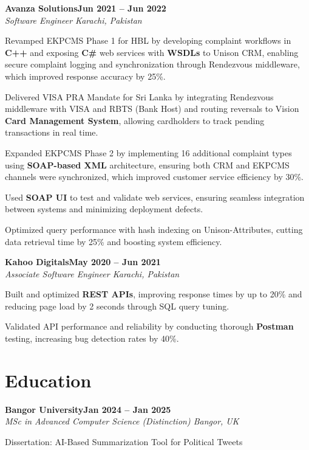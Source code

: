 \documentclass[letterpaper,10pt]{article}
\newcommand{\headingBf}[2]{
  \hspace{10pt}\textbf{#1}\hfill\textbf{#2}\\
}
\newcommand{\headingIt}[2]{
  \hspace{10pt}\textit{#1}\hfill\textit{#2}\\
}
\newenvironment{resume_list}{
  \vspace{-7pt}
  \begin{itemize}[itemsep=-2px, parsep=1pt, leftmargin=30pt]
}{
  \end{itemize}
}
\begin{document}
\headingBf{Avanza Solutions}{Jun 2021 -- Jun 2022}
\headingIt{Software Engineer \hfill Karachi, Pakistan}{}
\begin{resume_list}
    \item Revamped EKPCMS Phase 1 for HBL by developing complaint workflows in \textbf{C++} and exposing \textbf{C\#} web services with \textbf{WSDLs} to Unison CRM, enabling secure complaint logging and synchronization through Rendezvous middleware, which improved response accuracy by 25\%.
    \item Delivered VISA PRA Mandate for Sri Lanka by integrating Rendezvous middleware with VISA and RBTS (Bank Host) and routing reversals to Vision \textbf{Card Management System}, allowing cardholders to track pending transactions in real time.
    \item Expanded EKPCMS Phase 2 by implementing 16 additional complaint types using \textbf{SOAP-based XML} architecture, ensuring both CRM and EKPCMS channels were synchronized, which improved customer service efficiency by 30\%.
    \item Used \textbf{SOAP UI} to test and validate web services, ensuring seamless integration between systems and minimizing deployment defects.
    \item Optimized query performance with hash indexing on Unison-Attributes, cutting data retrieval time by 25\% and boosting system efficiency.
\end{resume_list}

\headingBf{Kahoo Digitals}{May 2020 -- Jun 2021}
\headingIt{Associate Software Engineer \hfill Karachi, Pakistan}{}
\begin{resume_list}
    \item Built and optimized \textbf{REST APIs}, improving response times by up to 20\% and reducing page load by 2 seconds through SQL query tuning.
    \item Validated API performance and reliability by conducting thorough \textbf{Postman} testing, increasing bug detection rates by 40\%.
\end{resume_list}

\section{Education}

\headingBf{Bangor University}{Jan 2024 -- Jan 2025}
\headingIt{MSc in Advanced Computer Science (Distinction) \hfill Bangor, UK}{}
\begin{resume_list}
    \item Dissertation: AI-Based Summarization Tool for Political Tweets
\end{resume_list}
\end{document}
